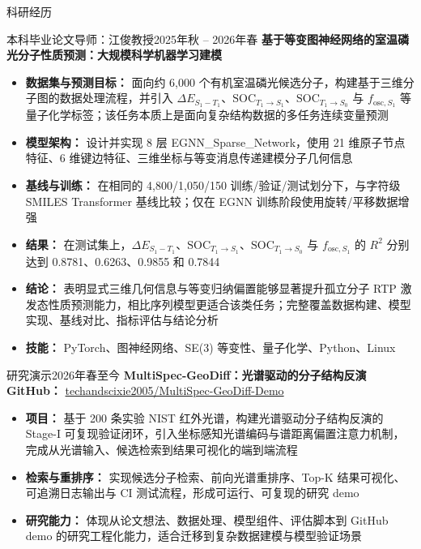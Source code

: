 \documentclass[]{mcdowellcv}
\begin{document}
\begin{cvsection}{科研经历}
	\begin{cvsubsection}{本科毕业论文}{导师：江俊教授}{2025年秋 -- 2026年春}
		\textbf{基于等变图神经网络的室温磷光分子性质预测：大规模科学机器学习建模}
		\begin{itemize}
			\item \textbf{数据集与预测目标：} 面向约 6,000 个有机室温磷光候选分子，构建基于三维分子图的数据处理流程，并引入 $\Delta E_{S_1-T_1}$、$\mathrm{SOC}_{T_1\to S_1}$、$\mathrm{SOC}_{T_1\to S_0}$ 与 $f_{\mathrm{osc},S_1}$ 等量子化学标签；该任务本质上是面向复杂结构数据的多任务连续变量预测
			\item \textbf{模型架构：} 设计并实现 8 层 EGNN\_Sparse\_Network，使用 21 维原子节点特征、6 维键边特征、三维坐标与等变消息传递建模分子几何信息
			\item \textbf{基线与训练：} 在相同的 4,800/1,050/150 训练/验证/测试划分下，与字符级 SMILES Transformer 基线比较；仅在 EGNN 训练阶段使用旋转/平移数据增强
			\item \textbf{结果：} 在测试集上，$\Delta E_{S_1-T_1}$、$\mathrm{SOC}_{T_1\to S_1}$、$\mathrm{SOC}_{T_1\to S_0}$ 与 $f_{\mathrm{osc},S_1}$ 的 $R^2$ 分别达到 0.8781、0.6263、0.9855 和 0.7844
			\item \textbf{结论：} 表明显式三维几何信息与等变归纳偏置能够显著提升孤立分子 RTP 激发态性质预测能力，相比序列模型更适合该类任务；完整覆盖数据构建、模型实现、基线对比、指标评估与结论分析
			\item \textbf{技能：} PyTorch、图神经网络、SE(3) 等变性、量子化学、Python、Linux
		\end{itemize}
	\end{cvsubsection}

	\begin{cvsubsection}{研究演示}{}{2026年春至今}
		\textbf{MultiSpec-GeoDiff：光谱驱动的分子结构反演} \hfill \textbf{GitHub：} \href{https://github.com/techandscixie2005/MultiSpec-GeoDiff-Demo}{techandscixie2005/MultiSpec-GeoDiff-Demo}
		\begin{itemize}
			\item \textbf{项目：} 基于 200 条实验 NIST 红外光谱，构建光谱驱动分子结构反演的 Stage-I 可复现验证闭环，引入坐标感知光谱编码与谱距离偏置注意力机制，完成从光谱输入、候选检索到结果可视化的端到端流程
			\item \textbf{检索与重排序：} 实现候选分子检索、前向光谱重排序、Top-K 结果可视化、可追溯日志输出与 CI 测试流程，形成可运行、可复现的研究 demo
			\item \textbf{研究能力：} 体现从论文想法、数据处理、模型组件、评估脚本到 GitHub demo 的研究工程化能力，适合迁移到复杂数据建模与模型验证场景
		\end{itemize}
	\end{cvsubsection}


\end{cvsection}
\end{document}
